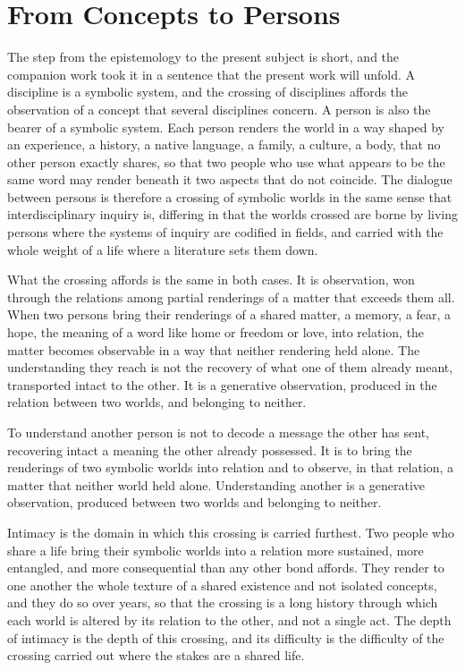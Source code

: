 \section{From Concepts to Persons}
\label{p27:sec:bridge}

\noindent
The step from the epistemology to the present subject is short, and the companion work took it in a sentence that the present work will unfold. A discipline is a symbolic system, and the crossing of disciplines affords the observation of a concept that several disciplines concern. A person is also the bearer of a symbolic system. Each person renders the world in a way shaped by an experience, a history, a native language, a family, a culture, a body, that no other person exactly shares, so that two people who use what appears to be the same word may render beneath it two aspects that do not coincide. The dialogue between persons is therefore a crossing of symbolic worlds in the same sense that interdisciplinary inquiry is, differing in that the worlds crossed are borne by living persons where the systems of inquiry are codified in fields, and carried with the whole weight of a life where a literature sets them down.

What the crossing affords is the same in both cases. It is observation, won through the relations among partial renderings of a matter that exceeds them all. When two persons bring their renderings of a shared matter, a memory, a fear, a hope, the meaning of a word like home or freedom or love, into relation, the matter becomes observable in a way that neither rendering held alone. The understanding they reach is not the recovery of what one of them already meant, transported intact to the other. It is a generative observation, produced in the relation between two worlds, and belonging to neither.

\begin{claim}
To understand another person is not to decode a message the other has sent, recovering intact a meaning the other already possessed. It is to bring the renderings of two symbolic worlds into relation and to observe, in that relation, a matter that neither world held alone. Understanding another is a generative observation, produced between two worlds and belonging to neither.
\end{claim}

Intimacy is the domain in which this crossing is carried furthest. Two people who share a life bring their symbolic worlds into a relation more sustained, more entangled, and more consequential than any other bond affords. They render to one another the whole texture of a shared existence and not isolated concepts, and they do so over years, so that the crossing is a long history through which each world is altered by its relation to the other, and not a single act. The depth of intimacy is the depth of this crossing, and its difficulty is the difficulty of the crossing carried out where the stakes are a shared life.

